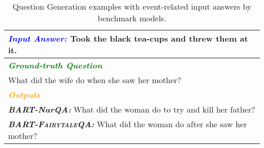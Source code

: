 \documentclass[11pt]{article}
\newcommand{\datasetname}{\textsc{FairytaleQA}\xspace}
\newcommand\tab[1][0.5cm]{\hspace*{#1}}
\begin{document}
\begin{table}[t!]
{\begin{tabular}{p{}}
\midrule
\textit{\textbf{\textcolor{blue}{Input Answer: }}} Took the black tea-cups and threw them at it.   \\
\midrule
\textit{\textbf{\textcolor{green}{Ground-truth Question}}}                         \\
What did the wife do when she saw her mother?  \\
\midrule
\textit{\textbf{\textcolor{orange}{Outputs}}}                            \\
\tab \textit{\textbf{BART-NarQA:}}  What did the woman do to try and kill her father?         \\
\tab \textit{\textbf{BART-\datasetname:}}  What did the woman do after she saw her mother?     \\


\bottomrule
\end{tabular}}

\caption{Question Generation examples with event-related input answers by benchmark models. }
\label{tab:qg_example_appeldix}
\end{table}
\end{document}
